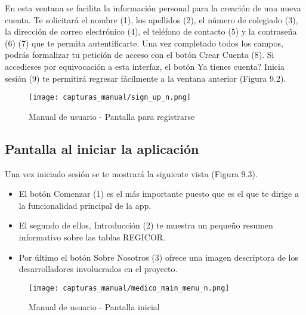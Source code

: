 \documentclass[11pt,spanish,
		listoftables,listoffigures]
		{tfgplantilla}
\begin{document}
En esta ventana se facilita la información personal para la creación de una nueva cuenta. Te solicitará el nombre (1), los apellidos (2), el número de colegiado (3), la dirección de correo electrónico (4), el teléfono de contacto (5) y la contraseña (6) (7) que te permita autentificarte. Una vez completado todos los campos, podrás formalizar tu petición de acceso con el botón \textquotedbl Crear Cuenta\textquotedbl{} (8). Si accedieses por equivocación a esta interfaz, el botón \textquotedbl Ya tienes cuenta? Inicia sesión\textquotedbl{} (9) te permitirá regresar fácilmente a la ventana anterior (Figura 9.2).


\begin{figure}[H]
\centering
\texttt{[image: capturas\_manual/sign\_up\_n.png]}
\caption{Manual de usuario - Pantalla para registrarse}
\end{figure}

\subsection {Pantalla al iniciar la aplicación}

Una vez iniciado sesión se te mostrará la siguiente vista (Figura 9.3). 

\begin{itemize}
	\item El botón \textquotedbl Comenzar\textquotedbl{} (1) es el más importante puesto que es el que te dirige a la funcionalidad principal de la app.

	\item El segundo de ellos, \textquotedbl Introducción\textquotedbl{} (2) te muestra un pequeño resumen informativo sobre las tablas REGICOR.

	\item Por último el botón \textquotedbl Sobre Nosotros\textquotedbl{} (3) ofrece una imagen descriptora de los desarrolladores involucrados en el proyecto.
\end{itemize}

\newpage
\begin{figure}[H]
\centering
\texttt{[image: capturas\_manual/medico\_main\_menu\_n.png]}
\caption{Manual de usuario - Pantalla inicial}
\end{figure}
\end{document}
